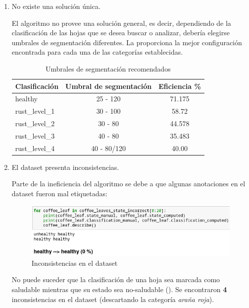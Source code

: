 \begin{enumerate}
\item No existe una solución única.

El algoritmo no provee una solución general, es decir, dependiendo de la clasificación de las hojas que se desea buscar o analizar, debería elegirse umbrales de segmentación diferentes. La  proporciona la mejor configuración encontrada para cada una de las categorías establecidas.

\begin{table}[H]
\centering
\begin{tabular}{|l|c|c|}
\hline 
\textbf{Clasificación} & \textbf{Umbral de segmentación} & \textbf{Eficiencia \%}\\ 
\hline 
healthy & 25 - 120 & 71.175 \\ 
\hline 
rust\_level\_1 & 30 - 100 & 58.72 \\ 
\hline 
rust\_level\_2 & 30 - 80 & 44.578 \\ 
\hline 
rust\_level\_3 & 40 - 80 & 35.483 \\ 
\hline 
rust\_level\_4 & 40 - 80/120 & 40.00 \\ 
\hline 
\end{tabular}
\caption{Umbrales de segmentación recomendados}
\label{table:recommended_segmentation}
\end{table}

\item El dataset presenta inconsistencias.

Parte de la ineficiencia del algoritmo se debe a que algunas anotaciones en el dataset fueron mal etiquetadas:

\begin{figure}[H]
\centering
\includegraphics[width=\textwidth]{images/consideration_tag_error.png}
\caption{Inconsistencias en el dataset}
\label{img:dataset_inconsistencies}
\end{figure}

No puede suceder que la clasificación de una hoja sea marcada como saludable mientras que su estado sea no-saludable (). Se encontraron \textbf{4} inconsistencias en el dataset (descartando la categoría \textit{araña roja}).

\end{enumerate}

